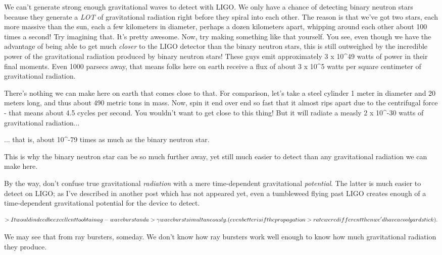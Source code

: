 We can't generate strong enough gravitational waves to detect 
with LIGO.  We only have a chance of detecting binary neutron 
stars because they generate a \emph{LOT} of gravitational radiation
right before they spiral into each other.  The reason is that 
we've got two stars, each more massive than the sun, each a 
few kilometers in diameter, perhaps a dozen kilometers apart,
whipping around each other about 100 times a second!  
Try imagining that.  It's pretty awesome.
Now, try making something like that yourself.  
You see, even though we have the advantage of being able to get 
much \emph{closer} to the LIGO detector than the binary neutron stars,
this is still outweighed by the incredible power of the 
gravitational radiation produced by binary neutron stars!
These guys emit approximately 3 x 10^{49} watts of power in
their final moments.  Even 1000 parsecs away, that means 
folks here on earth receive a flux of about 3 x 10^{5} watts 
per square centimeter of gravitational radiation.  

There's nothing we can make here on earth that comes close to 
that.  For comparison, let's take a steel cylinder 1 meter 
in diameter and 20 meters long, and thus about 490 metric
tons in mass.  Now, spin it end over end so fast that it 
almost rips apart due to the centrifugal force - that means 
about 4.5 cycles per second.  You wouldn't want to get close to 
this thing!  But it will radiate a measly 2 x 10^{-30} watts of 
gravitational radiation... 

... that is, about 10^{-79} times as much as the binary neutron star.  

This is why the binary neutron star can be so much further away,
yet still much easier to detect than any gravitational radiation
we can make here.

By the way, don't confuse true gravitational \emph{radiation} with a 
mere time-dependent gravitational \emph{potential}.  The latter is
much easier to detect on LIGO; as I've described in another
post which has not appeared yet, even a tumbleweed flying past 
LIGO creates enough of a time-dependent gravitational potential 
for the device to detect.

$$
>It would indeed be excellent to obtain a g-wave burst and a 
>\gamma  wave burst simultaneously. (even better is if the propagation
>rate were different then we'd have a \emph{cool} yardstick).
$$
    
We may see that from \gamma  ray bursters, someday.  We don't
know how \gamma  ray bursters work well enough to know how much
gravitational radiation they produce.

